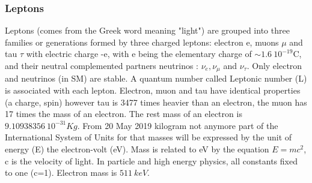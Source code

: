 \subsubsection{Leptons}
Leptons (comes from the Greek word meaning "light") are grouped into three families or generations formed by three charged leptons: electron e, muons $\mu$ and tau $\tau$ with electric charge -e, with e being the elementary charge of $\sim 1.6 \ 10^{-19} $C, and their neutral complemented partners neutrinos : $\nu_{e}, \nu_{\mu}$ and $\nu_{\tau}$. Only electron and neutrinos (in SM) are stable. A quantum number called Leptonic number (L) is associated with each lepton. Electron, muon and tau have identical properties (a charge, spin) however tau is 3477 times heavier than an electron, the muon has 17 times the mass of an electron. The rest mass of an electron is $9.10938356 \ 10^{-31} Kg$. From 20 May 2019  kilogram not anymore part of the International System of Units for that masses will be expressed by the unit of energy (E) the electron-volt (eV). Mass is related to eV by the equation $E=mc^2$, c is the velocity of light. In particle and high energy physics, all constants fixed to one (c=1). Electron mass is $511 \ keV$.
